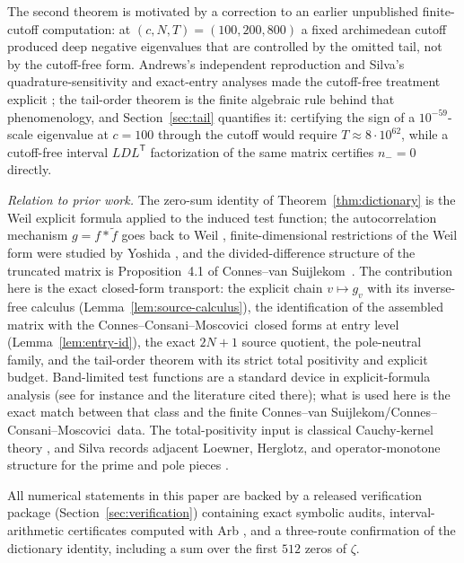 \documentclass[11pt]{article}
\theoremstyle{plain}
\theoremstyle{definition}
\theoremstyle{remark}
\newcommand{\cvs}{Connes--van Suijlekom}
\newcommand{\ccm}{Connes--Consani--Moscovici}
\begin{document}
The second theorem is motivated by a correction to an earlier unpublished
finite-cutoff computation: at $(c,N,T)=(100,200,800)$ a fixed archimedean
cutoff produced deep negative eigenvalues that are controlled by the omitted
tail, not by the cutoff-free form.  Andrews's independent reproduction and
Silva's quadrature-sensitivity and exact-entry analyses made the cutoff-free
treatment explicit \cite{Andrews20427500,Silva20650146,Silva20671635}; the
tail-order theorem is the finite algebraic rule behind that phenomenology,
and Section~\ref{sec:tail} quantifies it: certifying the sign of a
$10^{-59}$-scale eigenvalue at $c=100$ through the cutoff would require
$T\approx8\cdot10^{62}$, while a cutoff-free interval $LDL^{\mathsf T}$
factorization of the same matrix certifies $n_-=0$ directly.

\emph{Relation to prior work.}  The zero-sum identity of
Theorem~\ref{thm:dictionary} is the Weil explicit formula applied to the
induced test function; the autocorrelation mechanism $g=f*\tilde f$ goes back
to Weil \cite{Weil1952}, finite-dimensional restrictions of the Weil form were
studied by Yoshida \cite{Yoshida1992}, and the divided-difference structure of
the truncated matrix is Proposition~4.1 of \cvs\
\cite{ConnesvanSuijlekom2025}.  The contribution here is the exact closed-form
transport: the explicit chain $v\mapsto g_v$ with its inverse-free calculus
(Lemma~\ref{lem:source-calculus}), the identification of the assembled matrix
with the \ccm\ closed forms at entry level (Lemma~\ref{lem:entry-id}), the
exact $2N{+}1$ source quotient, the pole-neutral family, and the tail-order
theorem with its strict total positivity and explicit budget.  Band-limited
test functions are a standard device in explicit-formula analysis (see for
instance \cite{ChirreMolero2026} and the literature cited there); what is used
here is the exact match between that class and the finite \cvs/\ccm\ data.
The total-positivity input is classical Cauchy-kernel theory
\cite{Karlin1968,Simon2014CauchyTP,BertolaGekhtmanSzmigielski2009}, and Silva
records adjacent Loewner, Herglotz, and operator-monotone structure for the
prime and pole pieces
\cite{Silva20710075,Silva20737111,Silva20682834,Silva20694588}.

All numerical statements in this paper are backed by a released verification
package (Section~\ref{sec:verification}) containing exact symbolic audits,
interval-arithmetic certificates computed with Arb \cite{Johansson2017Arb},
and a three-route confirmation of the dictionary identity, including a sum
over the first $512$ zeros of $\zeta$.
\end{document}
